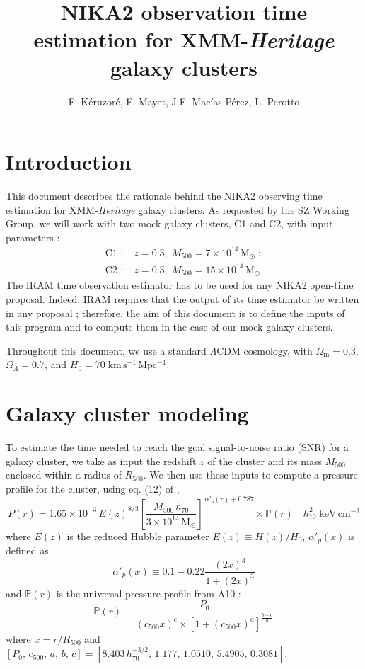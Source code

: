 \documentclass[11pt]{article}
\title{\textbf{NIKA2 observation time estimation for XMM-\textit{Heritage} galaxy clusters}}
\author{F. K\'eruzor\'e, F. Mayet, J.F. Mac\'ias-P\'erez, L. Perotto}
\newcommand{\fh}{_{500}}
\begin{document}
\maketitle

\section{Introduction}

This document describes the rationale behind the NIKA2 observing time estimation for XMM-\textit{Heritage} galaxy clusters.
As requested by the SZ Working Group, we will work with two mock galaxy clusters, C1 and C2, with input parameters :
    \begin{align*}
        \text{C1 :}\;& z = 0.3, \; M\fh = 7\times 10^{14} \,\mathrm{M}_\odot \; ; \\
        \text{C2 :}\;& z = 0.3, \; M\fh = 15\times 10^{14}\, \mathrm{M}_\odot
    \end{align*}
The IRAM time observation estimator \citep{Ladjelate2018} has to be used for any NIKA2 open-time proposal.
Indeed, IRAM requires that the output of its time estimator be written in any proposal ; therefore, the aim of this document is to define the inputs of this program and to compute them in the case of our mock galaxy clusters.

Throughout this document, we use a standard $\Lambda$CDM cosmology, with $\Omega_\mathrm{m}=0.3$, $\Omega_\Lambda=0.7$, and $H_0=70\;\mathrm{km\,s^{-1}\,Mpc^{-1}}$.

\section{Galaxy cluster modeling} \label{cluster}

To estimate the time needed to reach the goal signal-to-noise ratio (SNR) for a galaxy cluster, we take as input the redshift $z$ of the cluster and its mass $M\fh$ enclosed within a radius of $R\fh$.
We then use these inputs to compute a pressure profile for the cluster, using eq. (12) of \citet[][hereafter A10]{Arnaud2010},
    \begin{equation}
        P(r) = 1.65\times 10^{-3} \,E(z)^{8/3} \left[ \frac{M\fh\,h_{70}}{3\times 10^{14} \,\mathrm{M}_\odot} \right]^{\,\alpha'_p(r)+0.787} \times \mathbb{P}(r) \quad h_{70}^2 \;\mathrm{keV\,cm^{-3}}
    \end{equation}
where $E(z)$ is the reduced Hubble parameter $E(z) \equiv H(z)/H_0$, $\alpha'_p(x)$ is defined as 
    \begin{equation}
        \alpha'_p(x) \equiv 0.1 - 0.22\frac{(2x)^3}{1+(2x)^3}
    \end{equation}
and $\mathbb{P}(r)$ is the universal pressure profile from A10 :
    \begin{equation}
        \mathbb{P}(r) \equiv \frac{P_0}{\left(c\fh x\right)^c \times \left[1+\left(c\fh x\right)^a\right]^\frac{b-c}{a}}
    \end{equation}
where $x = r/R\fh$ and $[P_0,\, c\fh,\, a,\, b,\, c] = [8.403\,h_{70}^{-3/2},\, 1.177,\, 1.0510,\, 5.4905,\, 0.3081]$.
\end{document}
